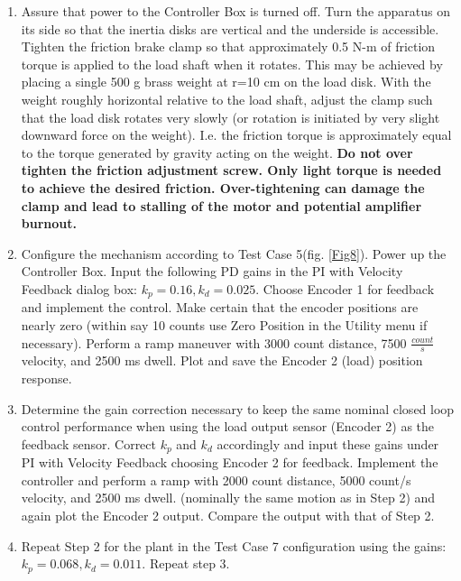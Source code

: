 \documentclass[11pt, a4paper]{article}
\begin{document}
\begin{enumerate}
\item Assure that power to the Controller Box is turned off. Turn the apparatus on its side so that the inertia disks are vertical and the underside is accessible. Tighten the friction brake clamp so that approximately 0.5 N-m of friction torque is applied to the load shaft when it rotates. This may be achieved by placing a single 500 g brass weight at r=10 cm on the load disk. With the weight roughly horizontal relative to the load shaft, adjust the clamp such that the load disk rotates very slowly (or rotation is initiated by very slight downward force on the weight). I.e. the friction torque is approximately equal to the torque generated by gravity acting on the weight. \textbf{Do not over tighten the friction adjustment screw. Only light torque is needed to achieve the desired friction. Over-tightening can damage the clamp and lead to stalling of the motor and potential amplifier burnout.}
\item Configure the mechanism according to Test Case 5(fig. \ref{Fig8}). Power up the Controller Box. Input the following PD gains in the PI with Velocity Feedback dialog box: $k_p = 0.16,k_d = 0.025$. Choose Encoder 1 for feedback and implement the control. Make certain that the encoder positions are nearly zero (within say 10 counts use Zero Position in the Utility menu if necessary). Perform a ramp maneuver with 3000 count distance, 7500 $\frac{count}{s}$ velocity, and 2500 ms dwell. Plot and save the Encoder 2 (load) position response.
\item Determine the gain correction necessary to keep the same nominal closed loop control performance when using the load output sensor (Encoder 2) as the feedback sensor. Correct $k_p$ and $k_d$ accordingly and input these gains under PI with Velocity Feedback choosing Encoder 2 for feedback. Implement the controller and perform a ramp with 2000 count distance, 5000 count/s velocity, and 2500 ms dwell. (nominally the same motion as in Step 2) and again plot the Encoder 2 output. Compare the output with that of Step 2.
\item Repeat Step 2 for the plant in the Test Case 7 configuration using the gains: $k_p = 0.068,k_d = 0.011.$ Repeat step 3.
\end{enumerate}
\end{document}
